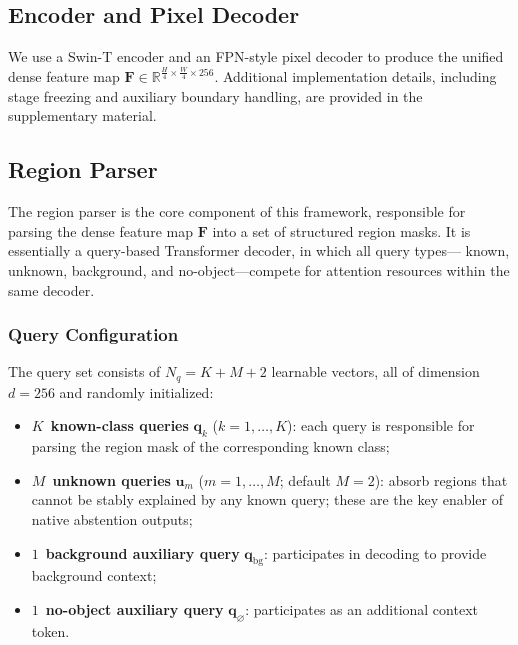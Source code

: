 \documentclass[journal]{IEEEtai}
\newcommand{\R}{\mathbb{R}}
\newcommand{\bF}{\mathbf{F}}
\newcommand{\bq}{\mathbf{q}}
\newcommand{\bu}{\mathbf{u}}
\begin{document}
\subsection{Encoder and Pixel Decoder}\label{sec:method:encoder}

We use a Swin-T encoder and an FPN-style pixel decoder to produce the unified dense
feature map $\bF \in \R^{\frac{H}{4} \times \frac{W}{4} \times 256}$.
Additional implementation details, including stage freezing and auxiliary boundary
handling, are provided in the supplementary material.

\subsection{Region Parser}\label{sec:method:parser}

The region parser is the core component of this framework, responsible for parsing
the dense feature map $\bF$ into a set of structured region masks.
It is essentially a query-based Transformer decoder, in which all query types---
known, unknown, background, and no-object---compete for attention resources within
the same decoder.

\subsubsection{Query Configuration}\label{sec:method:parser:query}

The query set consists of $N_q = K + M + 2$ learnable vectors, all of dimension
$d=256$ and randomly initialized:

\begin{itemize}[nosep]
  \item $K$~\textbf{known-class queries} $\bq_k$ ($k = 1, \ldots, K$):
        each query is responsible for parsing the region mask of the corresponding
        known class;
  \item $M$~\textbf{unknown queries} $\bu_m$ ($m = 1, \ldots, M$; default $M=2$):
        absorb regions that cannot be stably explained by any known query;
        these are the key enabler of native abstention outputs;
  \item $1$~\textbf{background auxiliary query} $\bq_{\text{bg}}$:
        participates in decoding to provide background context;
  \item $1$~\textbf{no-object auxiliary query} $\bq_{\varnothing}$:
        participates as an additional context token.
\end{itemize}
\end{document}
